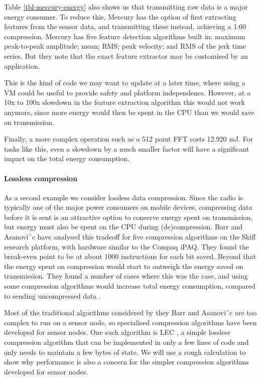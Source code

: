 Table \ref{tbl-mercury-energy} also shows us that transmitting raw data is a major energy consumer. To reduce this, Mercury has the option of first extracting features from the sensor data, and transmitting these instead, achieving a 1:60 compression. Mercury has five feature detection algorithms built in: maximum peak-to-peak amplitude; mean; RMS; peak velocity; and RMS of the jerk time series. But they note that the exact feature extractor may be customised by an application.

This is the kind of code we may want to update at a later time, where using a VM could be useful to provide safety and platform independence. However, at a 10x to 100x slowdown in the feature extraction algorithm this would not work anymore, since more energy would then be spent in the CPU than we would save on transmission.

Finally, a more complex operation such as a 512 point FFT costs 12.920 mJ. For tasks like this, even a slowdown by a much smaller factor will have a significant impact on the total energy consumption.

\paragraph{Lossless compression}
As a second example we consider lossless data compression. Since the radio is typically one of the major power consumers on mobile devices, compressing data before it is sent is an attractive option to conserve energy spent on transmission, but energy must also be spent on the CPU during (de)compression. Barr and Asanovi\ ́c have analysed this tradeoff for five compression algorithms on the Skiff research platform, with hardware similar to the Compaq iPAQ. They found the break-even point to be at about 1000 instructions for each bit saved. Beyond that the energy spent on compression would start to outweigh the energy saved on transmission. They found a number of cases where this was the case, and using some compression algorithms would increase total energy consumption, compared to sending uncompressed data \cite{Barr:2006vg}.

Most of the traditional algorithms considered by they Barr and Asanovi\ ́c are too complex to run on a sensor node, so specialised compression algorithms have been developed for sensor nodes. One such algorithm is LEC \cite{Marcelloni:2009ja}, a simple lossless compression algorithm that can be implemented in only a few lines of code and only needs to maintain a few bytes of state. We will use a rough calculation to show why performance is also a concern for the simpler compression algorithms developed for sensor nodes.


